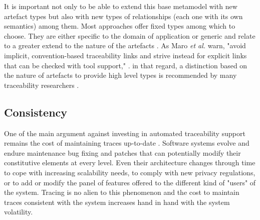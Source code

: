 It is important not only to be able to extend this base metamodel with new artefact types but also with new types of relationships (each one with its own semantics) among them. 
Most approaches offer fixed types among which to choose. They are either specific to the domain of application \cite{pavalkis2017-TIM-for-BPMN,florez2019-finegrained-req2code} or generic and relate to a greater extend to the nature of the artefacts \cite{seibel2012-efficient-traceability-for-MDE,diaz2015-tracing-variability-from-features-to-product-line-SPL}. As Maro \textit{et al.} warn, "avoid implicit, convention-based traceability links and strive instead for explicit links that can be checked with tool support," \cite{maro2016_maintenance_factors_and_guidelines}.
in that regard, a distinction based on the nature of artefacts to provide high level types is recommended by many traceability researchers \cite{clelandhuang2014-traceability-trends-and-futurte-direction}. 


\subsection{Consistency}
One of the main argument against investing in automated traceability support remains the cost of maintaining traces up-to-date \cite{clelandhuang2014-traceability-trends-and-futurte-direction}.
Software systems evolve and endure maintenance bug fixing and patches that can potentially modify their constitutive elements at every level. Even their architecture changes through time to cope with increasing scalability needs, to comply with new privacy regulations, or to add or modify the panel of features offered to the different kind of "users" of the system.
Tracing is no alien to this phenomenon and the cost to maintain traces consistent with the system increases hand in hand with the system volatility.

